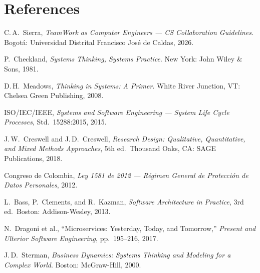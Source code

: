 \documentclass[12pt,a4paper]{article}
\begin{document}
\section*{References}
\begin{enumerate}[label={[\arabic*]},leftmargin=1.5em,itemsep=2pt]
\item C.\,A.\ Sierra, \emph{TeamWork as Computer Engineers --- CS Collaboration Guidelines}. Bogotá: Universidad Distrital Francisco José de Caldas, 2026.
\item P.\ Checkland, \emph{Systems Thinking, Systems Practice}. New York: John Wiley \& Sons, 1981.
\item D.\,H.\ Meadows, \emph{Thinking in Systems: A Primer}. White River Junction, VT: Chelsea Green Publishing, 2008.
\item ISO/IEC/IEEE, \emph{Systems and Software Engineering --- System Life Cycle Processes}, Std.\ 15288:2015, 2015.
\item J.\,W.\ Creswell and J.\,D.\ Creswell, \emph{Research Design: Qualitative, Quantitative, and Mixed Methods Approaches}, 5th ed.\ Thousand Oaks, CA: SAGE Publications, 2018.
\item Congreso de Colombia, \emph{Ley 1581 de 2012 --- Régimen General de Protección de Datos Personales}, 2012.
\item L.\ Bass, P.\ Clements, and R.\ Kazman, \emph{Software Architecture in Practice}, 3rd ed.\ Boston: Addison-Wesley, 2013.
\item N.\ Dragoni et al., ``Microservices: Yesterday, Today, and Tomorrow,'' \emph{Present and Ulterior Software Engineering}, pp.\ 195--216, 2017.
\item J.\,D.\ Sterman, \emph{Business Dynamics: Systems Thinking and Modeling for a Complex World}. Boston: McGraw-Hill, 2000.
\end{enumerate}
\end{document}
